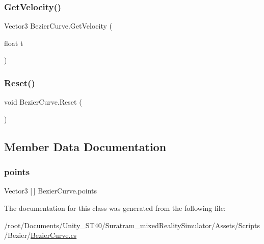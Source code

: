 \subsubsection{\texorpdfstring{Get\+Velocity()}{GetVelocity()}}
{\footnotesize\ttfamily Vector3 Bezier\+Curve.\+Get\+Velocity (\begin{DoxyParamCaption}\item[{float}]{t }\end{DoxyParamCaption})\hspace{0.3cm}{\ttfamily [inline]}}

\mbox{\label{classBezierCurve_a75b57f3aa46a6bb6679dfa79262e29ad}} 
\subsubsection{\texorpdfstring{Reset()}{Reset()}}
{\footnotesize\ttfamily void Bezier\+Curve.\+Reset (\begin{DoxyParamCaption}{ }\end{DoxyParamCaption})\hspace{0.3cm}{\ttfamily [inline]}}



\subsection{Member Data Documentation}
\mbox{\label{classBezierCurve_a77f62121b4b7ffb30b169d91691ebcbf}} 
\subsubsection{\texorpdfstring{points}{points}}
{\footnotesize\ttfamily Vector3 \mbox{[}$\,$\mbox{]} Bezier\+Curve.\+points}



The documentation for this class was generated from the following file\+:\begin{DoxyCompactItemize}
\item 
/root/\+Documents/\+Unity\+\_\+\+S\+T40/\+Suratram\+\_\+mixed\+Reality\+Simulator/\+Assets/\+Scripts/\+Bezier/\hyperlink{BezierCurve_8cs}{Bezier\+Curve.\+cs}\end{DoxyCompactItemize}
